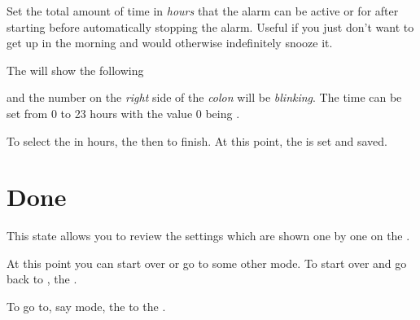 Set the total amount of time in \textit{hours} that the alarm can be active or
 for after starting before automatically stopping the alarm.
Useful if you just don't want to get up in the morning and would otherwise
indefinitely snooze it.


The  will show the following


and the number on the \textit{right} side of the \textit{colon} will be
\textit{blinking}.  The time can be set from
\num{0} to \num{23} hours with the value \num{0} being .

\par\medskip

To select the  in hours,  the  then  to finish.
At this point, the  is set and saved.


\section{Done} 

This state allows you to review the settings which are shown one by one on
the .

\par\medskip

At this point you can start over or go to some other mode.  To start over and
go back to ,  the .


To go to, say  mode,  the  to the .



